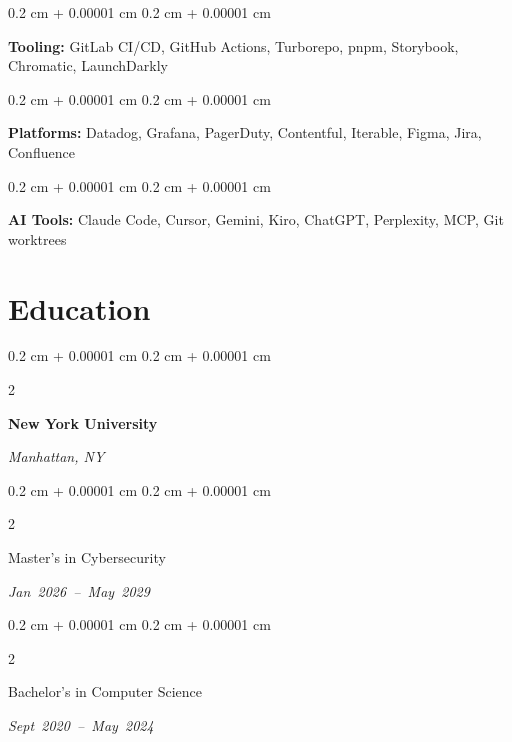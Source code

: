 \documentclass[10pt, letterpaper]{article}
\newenvironment{onecolentry}{
    \begin{adjustwidth}{
        0.2 cm + 0.00001 cm
    }{
        0.2 cm + 0.00001 cm
    }
}{
    \end{adjustwidth}
} %
\newenvironment{twocolentry}[2][]{
    \onecolentry
    \def\secondColumn{#2}
    \setcolumnwidth{\fill, 4.5 cm}
    \begin{paracol}{2}
}{
    \switchcolumn \raggedleft \secondColumn
    \end{paracol}
    \endonecolentry
} %
\begin{document}
        \begin{onecolentry}
            \textbf{Tooling:} GitLab CI/CD, GitHub Actions, Turborepo, pnpm, Storybook, Chromatic, LaunchDarkly
        \end{onecolentry}

        \begin{onecolentry}
            \textbf{Platforms:} Datadog, Grafana, PagerDuty, Contentful, Iterable, Figma, Jira, Confluence
        \end{onecolentry}


        \begin{onecolentry}
            \textbf{AI Tools:} Claude Code, Cursor, Gemini, Kiro, ChatGPT, Perplexity, MCP, Git worktrees
        \end{onecolentry}

    \section{Education}

        \begin{twocolentry}{\textit{Manhattan, NY}}
            \textbf{New York University}
        \end{twocolentry}

        \begin{twocolentry}{\textit{\mbox{Jan 2026 – May 2029}}}
            Master's in Cybersecurity
        \end{twocolentry}

        \begin{twocolentry}{\textit{\mbox{Sept 2020 – May 2024}}}
            Bachelor's in Computer Science
        \end{twocolentry}


    
\end{document}
